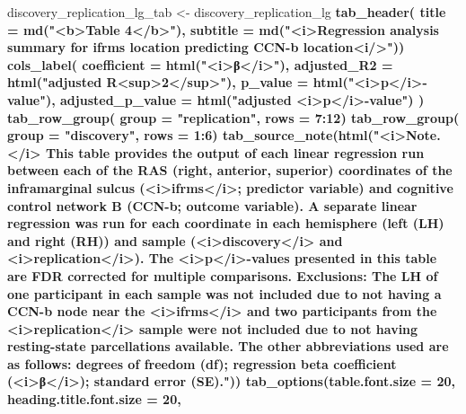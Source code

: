 \documentclass[
]{article}
\newenvironment{Shaded}{\begin{snugshade}}{\end{snugshade}}
\newcommand{\DataTypeTok}[1]{\textcolor[rgb]{0.13,0.29,0.53}{#1}}
\newcommand{\DecValTok}[1]{\textcolor[rgb]{0.00,0.00,0.81}{#1}}
\newcommand{\KeywordTok}[1]{\textcolor[rgb]{0.13,0.29,0.53}{\textbf{#1}}}
\newcommand{\NormalTok}[1]{#1}
\newcommand{\OperatorTok}[1]{\textcolor[rgb]{0.81,0.36,0.00}{\textbf{#1}}}
\newcommand{\StringTok}[1]{\textcolor[rgb]{0.31,0.60,0.02}{#1}}
\begin{document}
\begin{Shaded}
\begin{Highlighting}[]
\NormalTok{discovery_replication_lg_tab <-}\StringTok{ }\NormalTok{discovery_replication_lg }\OperatorTok{%>%}\StringTok{ }\KeywordTok{gt}\NormalTok{() }\OperatorTok{%>%}
\KeywordTok{tab_header}\NormalTok{(}
  \DataTypeTok{title =} \KeywordTok{md}\NormalTok{(}\StringTok{"<b>Table 4</b>"}\NormalTok{),}
  \DataTypeTok{subtitle =} \KeywordTok{md}\NormalTok{(}\StringTok{"<i>Regression analysis summary for ifrms location predicting CCN-b location<i/>"}\NormalTok{)) }\OperatorTok{%>%}
\StringTok{  }\KeywordTok{cols_label}\NormalTok{(}
    \DataTypeTok{coefficient =} \KeywordTok{html}\NormalTok{(}\StringTok{"<i>β</i>"}\NormalTok{),}
    \DataTypeTok{adjusted_R2 =} \KeywordTok{html}\NormalTok{(}\StringTok{"adjusted R<sup>2</sup>"}\NormalTok{),}
    \DataTypeTok{p_value =} \KeywordTok{html}\NormalTok{(}\StringTok{"<i>p</i>-value"}\NormalTok{),}
    \DataTypeTok{adjusted_p_value =} \KeywordTok{html}\NormalTok{(}\StringTok{"adjusted <i>p</i>-value"}\NormalTok{)}
\NormalTok{    ) }\OperatorTok{%>%}
\StringTok{  }\KeywordTok{tab_row_group}\NormalTok{(}
    \DataTypeTok{group =} \StringTok{"replication"}\NormalTok{,}
    \DataTypeTok{rows =} \DecValTok{7}\OperatorTok{:}\DecValTok{12}\NormalTok{) }\OperatorTok{%>%}
\StringTok{  }\KeywordTok{tab_row_group}\NormalTok{(}
    \DataTypeTok{group =} \StringTok{"discovery"}\NormalTok{,}
    \DataTypeTok{rows =} \DecValTok{1}\OperatorTok{:}\DecValTok{6}\NormalTok{) }\OperatorTok{%>%}
\KeywordTok{tab_source_note}\NormalTok{(}\KeywordTok{html}\NormalTok{(}\StringTok{"<i>Note.</i> This table provides the output of each linear regression run between each of the RAS (right, anterior, superior) coordinates of the inframarginal sulcus (<i>ifrms</i>; predictor variable) and cognitive control network B (CCN-b; outcome variable). A separate linear regression was run for each coordinate in each hemisphere (left (LH) and right (RH)) and sample (<i>discovery</i> and <i>replication</i>). The <i>p</i>-values presented in this table are FDR corrected for multiple comparisons. Exclusions: The LH of one participant in each sample was not included due to not having a CCN-b node near the <i>ifrms</i> and two participants from the <i>replication</i> sample were not included due to not having resting-state parcellations available. The other abbreviations used are as follows: degrees of freedom (df); regression beta coefficient (<i>β</i>); standard error (SE)."}\NormalTok{)) }\OperatorTok{%>%}
\StringTok{  }\KeywordTok{tab_options}\NormalTok{(}\DataTypeTok{table.font.size =} \DecValTok{20}\NormalTok{,}
    \DataTypeTok{heading.title.font.size =} \DecValTok{20}\NormalTok{,}
}}}}}}
\end{Highlighting}
\end{Shaded}
\end{document}
